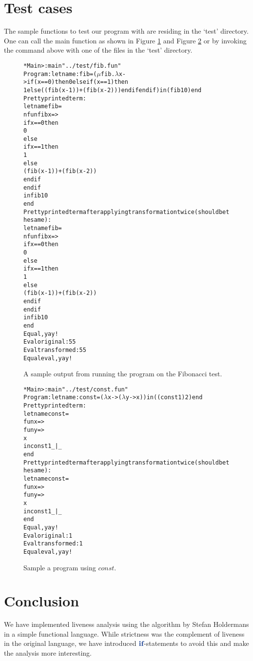 \documentclass[a4paper,11pt]{article}
\newcommand{\hKeyword}[1]{\textbf{\color{steelblue}{#1}}}
\newcommand{\Varid}[1]{\mathit{#1}}
\begin{document}
\section{Test cases}
  The sample functions to test our program with are residing in the `test'
  directory. One can call the main function as shown in Figure
  \ref{fig:sample-run} and Figure \ref{fig:const} or by invoking the command
  above with one of the files in the `test' directory.

\begin{figure}
{\small
\begin{alltt}
  *Main> :main "../test/fib.fun" 
  Program: let name: fib = (\(\mu\)fib.\(\lambda\)x -> if (x == 0) then 0 else if (x == 1) then 
            1 else ((fib (x - 1)) + (fib (x - 2))) endif endif) in (fib 10) end
  Pretty printed term:
  let name fib =
      nfun fib x =>
                 if x == 0 then
                   0
                 else
                   if x == 1 then
                     1
                   else
                     (fib (x - 1)) + (fib (x - 2))
                   endif
                 endif
  in fib 10
  end
  Pretty printed term after applying transformation twice (should be the same):
  let name fib =
      nfun fib x =>
                 if x == 0 then
                   0
                 else
                   if x == 1 then
                     1
                   else
                     (fib (x - 1)) + (fib (x - 2))
                   endif
                 endif
  in fib 10
  end
  Equal, yay!
  Eval original: 55
  Eval transformed: 55
  Equal eval, yay!
\end{alltt}
}
\caption{A sample output from running the program on the Fibonacci
test.}\label{fig:sample-run}
\end{figure}

\begin{figure}
  \begin{alltt}
    *Main> :main "../test/const.fun" 
    Program: let name: const = (\(\lambda\)x -> (\(\lambda\)y -> x)) in ((const 1) 2) end
    Pretty printed term:
    let name const =
        fun x =>
              fun y =>
                    x
    in const 1 _|_
    end
    Pretty printed term after applying transformation twice (should be the same):
    let name const =
        fun x =>
              fun y =>
                    x
    in const 1 _|_
    end
    Equal, yay!
    Eval original: 1
    Eval transformed: 1
    Equal eval, yay!
  \end{alltt}
  \caption{Sample a program using \ensuremath{\Varid{const}}.}\label{fig:const}
\end{figure}

\section{Conclusion}
  We have implemented liveness analysis using the algorithm by Stefan
  Holdermans in a simple functional language. While strictness was the
  complement of liveness in the original language, we have introduced
  \ensuremath{\hKeyword{if}}-statements to avoid this and make the analysis more interesting.



\end{document}
